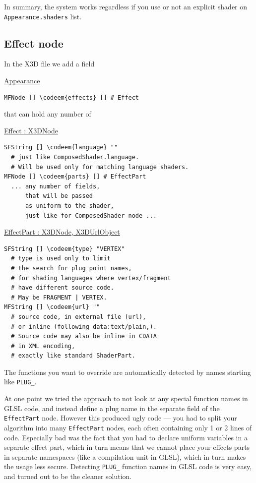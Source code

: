 \documentclass{acmsiggraph}                     %
\newenvironment{mycode}
{\begin{mycodecore}}
{\end{mycodecore}
\vspace{-0.1in}}
\newcommand*{\codeem}[1]{\textbf{#1}}
\begin{document}
In summary, the system works regardless if you use or not an explicit
shader on \texttt{Appearance.shaders} list.

\subsection{Effect node}

In the X3D file we add a field

\begin{mycode}
\underline{Appearance}
\begin{Verbatim}[commandchars=\\\{\}]
MFNode [] \codeem{effects} [] # Effect
\end{Verbatim}
\end{mycode}

that can hold any number of

\begin{mycode}
\underline{Effect : X3DNode}
\begin{Verbatim}[commandchars=\\\{\}]
SFString [] \codeem{language} ""
  # just like ComposedShader.language.
  # Will be used only for matching language shaders.
MFNode [] \codeem{parts} [] # EffectPart
  ... any number of fields,
      that will be passed
      as uniform to the shader,
      just like for ComposedShader node ...
\end{Verbatim}
\end{mycode}

\begin{mycode}
\underline{EffectPart : X3DNode, X3DUrlObject}
\begin{Verbatim}[commandchars=\\\{\}]
SFString [] \codeem{type} "VERTEX"
  # type is used only to limit
  # the search for plug point names,
  # for shading languages where vertex/fragment
  # have different source code.
  # May be FRAGMENT | VERTEX.
MFString [] \codeem{url} ""
  # source code, in external file (url),
  # or inline (following data:text/plain,).
  # Source code may also be inline in CDATA
  # in XML encoding,
  # exactly like standard ShaderPart.
\end{Verbatim}
\end{mycode}

The functions you want to override are automatically detected by names
starting like \texttt{PLUG\_}.

At one point we tried the approach
to not look at any special function names in GLSL code,
and instead define a plug name in the separate field of the \texttt{EffectPart}
node. However this produced ugly code --- you had to split your algorithm
into many \texttt{EffectPart} nodes, each often containing only 1 or 2 lines
of code. Especially bad was the fact that you had to declare uniform variables
in a separate effect part, which in turn means that we cannot place
your effects parts in separate namespaces (like a compilation unit in GLSL),
which in turn makes the usage less secure.
Detecting \texttt{PLUG\_} function names in GLSL code is very easy,
and turned out to be the cleaner solution.
\end{document}
